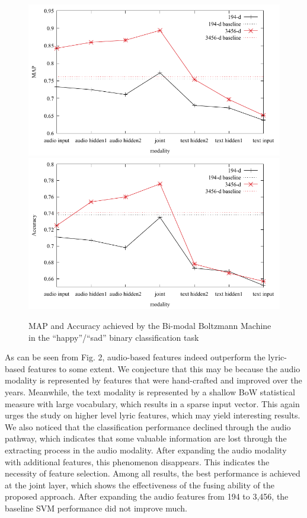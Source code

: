 \documentclass{llncs}
\begin{document}
\begin{figure}
	\centering
	\label{fg:performance}
	\includegraphics[width=.495\textwidth]{figures/map}
	\includegraphics[width=.495\textwidth]{figures/acc}
	\caption{MAP and Accuracy achieved by the Bi-modal Boltzmann Machine in the ``happy''/``sad'' binary classification task}%
\end{figure}

As can be seen from Fig. 2, audio-based features indeed outperform the lyric-based features to some extent. We conjecture that this may be because the audio modality is represented by features that were hand-crafted and improved over the years. Meanwhile, the text modality is represented by a shallow BoW statistical measure with large vocabulary, which results in a sparse input vector. This again urges the study on higher level lyric features, which may yield interesting results. 
We also noticed that the classification performance declined through the audio pathway, which indicates that some valuable information are lost through the extracting process in the audio modality. 
After expanding the audio modality with additional features, this phenomenon disappears. This indicates the necessity of feature selection. %
Among all results, the best performance is achieved at the joint layer, which shows the effectiveness of the fusing ability of the proposed approach. After expanding the audio features from 194 to 3,456, the baseline SVM performance did not improve much. %
\end{document}
